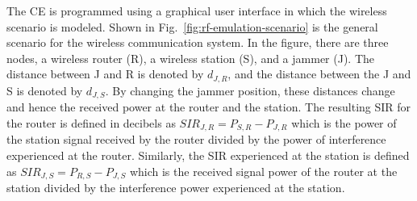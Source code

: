 The CE is programmed using a graphical user interface in which the wireless scenario is modeled. 
Shown in Fig.~\ref{fig:rf-emulation-scenario} is the general scenario for the wireless communication system. In the figure, there are three nodes, a wireless router (R), a wireless station (S), and a jammer (J). The distance between J and R is denoted by $d_{J,R}$, and the distance between the J and S is denoted by $d_{J,S}$. By changing the jammer position, these distances change and hence the received power at the router and the station. The resulting SIR for the router is defined in decibels as $SIR_{J,R} = P_{S,R}-P_{J,R}$ which is the power of the station signal received by the router divided by the power of interference experienced at the router.  Similarly, the SIR experienced at the station is defined as $SIR_{J,S} = P_{R,S}-P_{J,S}$ which is the received signal power of the router at the station divided by the interference power experienced at the station.

	
